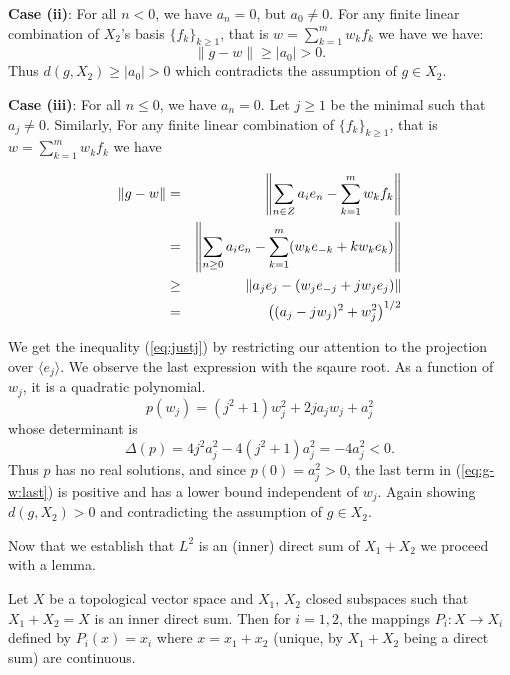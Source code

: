\begin{enumerate}
\textbf{Case (ii)}:  
For all \(n<0\), we have \(a_n=0\), but \(a_0\neq 0\).
For any finite linear combination of \(X_2\)'s basis \(\{f_k\}_{k\geq 1}\),
that is \(w = \sum_{k=1}^m w_k f_k\) we have
we have:
\begin{equation*}
\|g - w\| \geq |a_0| > 0.
\end{equation*}
Thus \(d(g,X_2) \geq |a_0| > 0\) which contradicts 
the assumption of \(g\in X_2\).

\textbf{Case (iii)}:  
For all \(n\leq0\), we have \(a_n=0\). Let \(j \geq 1\) be the minimal
such that \(a_j \neq 0\).
Similarly, For any finite linear combination of \(\{f_k\}_{k\geq 1}\),
that is \(w = \sum_{k=1}^m w_k f_k\) we have

\begin{eqnarray}
\|g - w\| 
&=& \left\|\sum_{n\in Z} a_i e_n - \sum_{k=1}^m w_k f_k\right\| \notag \\
&=& \left\|\sum_{n\geq 0} a_i e_n - 
           \sum_{k=1}^m (w_k e_{-k} + kw_k e_k)\right\|  \notag \\
&\geq& \left\| a_j e_j - (w_j e_{-j} + jw_j e_j)\right\| \label{eq:justj} \\
&=&  \left( (a_j - jw_j)^2 + w_j^2\right)^{1/2}  \label{eq:g-w:last}
\end{eqnarray}

We get the inequality (\ref{eq:justj}) by restricting our attention
to the projection over \(\langle e_j \rangle\).
We observe the last expression with the sqaure root.
As a function of \(w_j\), it is a quadratic polynomial.
\begin{equation*}
p(w_j) = (j^2+1)w_j^2 + 2ja_j w_j + a_j^2
\end{equation*}
whose determinant is 
\begin{equation*}
\Delta(p) = 4j^2a_j^2 - 4(j^2+1)a_j^2 = -4a_j^2 < 0.
\end{equation*}
Thus $p$ has no real solutions, and 
since \(p(0) = a_j^2 > 0\), the last term in (\ref{eq:g-w:last})
is positive and has a lower bound independent of \(w_j\).
Again showing \(d(g,X_2) > 0\) and contradicting the assumption
of \(g\in X_2\).

Now that we establish that \(L^2\) is an (inner) direct sum
of \(X_1 + X_2\) we proceed with a lemma.

\begin{llem}
Let $X$ be a  topological vector space
and \(X_1\), \(X_2\) closed subspaces such that
\(X_1 + X_2 = X\) is an inner direct sum.
Then for \(i=1,2\), the mappings \(P_i: X \rightarrow X_i\)
defined by \(P_i(x) = x_i\) where \(x = x_1 + x_2\) 
\textnormal{(unique, by \(X_1+X_2\) being a direct sum)}
are continuous.
\end{llem}


\end{enumerate}
